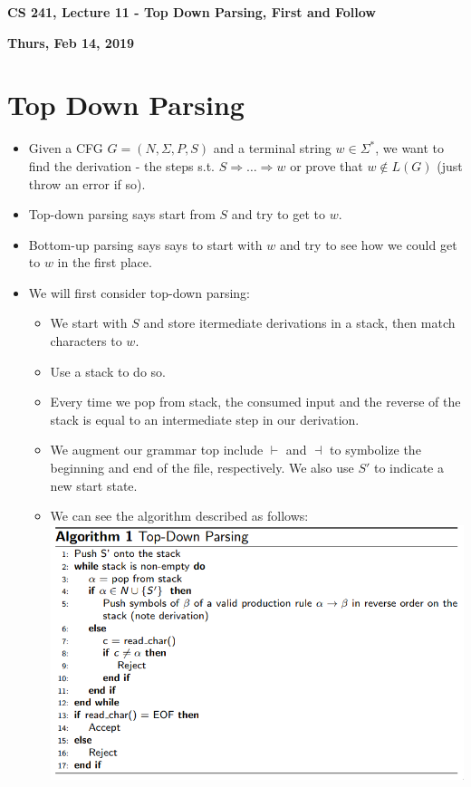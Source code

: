 \documentclass[12pt]{article}
\author{Clement Tsang}
\begin{document}
\begin{center}
\Large\textbf{CS 241, Lecture 11 - Top Down Parsing, First and Follow}
\end{center}
\begin{center}
\textbf{Thurs, Feb 14, 2019}
\end{center}

\section{Top Down Parsing}
\begin{itemize}
    \item Given a CFG $G = (N, \Sigma, P, S)$ and a terminal string $w \in \Sigma^*$, we want to find the derivation - the steps s.t. $S \Rightarrow \dots \Rightarrow w$ or prove that $w \not\in L(G)$ (just throw an error if so).
    \item Top-down parsing  says start from $S$ and try to get to $w$.
    \item Bottom-up parsing says says to start with $w$ and try to see how we could get to $w$ in the first place.
    \item We will first consider top-down parsing:
        \begin{itemize}
            \item We start with $S$ and store itermediate derivations in a stack, then match characters to $w$.  
            \item Use a stack to do so.  
            \item Every time we pop from stack, the consumed input and the reverse of the stack is equal to an intermediate step in our derivation.
            \item We augment our grammar top include $\vdash$ and $\dashv$ to symbolize the beginning and end of the file, respectively.  We also use $S'$ to indicate a new start state.
            \item We can see the algorithm described as follows: \\
                \includegraphics[scale=0.5]{top_down_alg.png}

\end{itemize}
\end{itemize}
\end{document}
